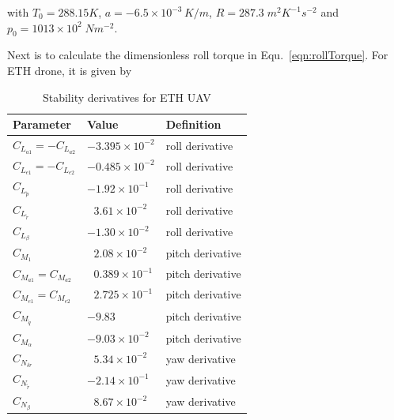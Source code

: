 with $T_0=288.15K$, $a = -6.5 \times 10^{-3} \, K/m$, $R=287.3\;m^2K^{-1}s^{-2}$ and $p_0=1013 \times 10^2 \;Nm^{-2}$.

Next is to calculate the dimensionless roll torque in Equ.~\ref{eqn:rollTorque}.
For ETH drone, it is given by \cite{stevens2015aircraft,ducard2009fault,mockli2006guidance}

\begin{table}
\label{arm:momentsETHcraft}
\caption{Stability derivatives for ETH UAV \cite{ducard2009fault}}
\label{arm:ethcraftStabilityDeriv}
\begin{center}
\begin{tabular}{ ||p{3cm}|p{3cm}|p{3cm}||}\hline
\textbf{Parameter} & \textbf{Value} & \textbf{Definition} \\\hline
$C_{L_{a1}} = - C_{L_{a2}}$ & $-3.395 \times 10^{-2}$	   & roll derivative \\\hline
$C_{L_{e1}} = - C_{L_{e2}}$ & $-0.485 \times 10^{-2}$         & roll derivative \\\hline
$C_{L_{\tilde{p}}}$                 & $-1.92 \times 10^{-1}$	   & roll derivative \\\hline
$C_{L_{\tilde{r}}} $                 & $\ \ \, 3.61 \times 10^{-2}$     & roll derivative \\\hline
$C_{L_\beta}$                        & $-1.30 \times 10^{-2}$	   & roll derivative \\\hline
$ C_{M_{1}}$                          & $\ \ \, 2.08 \times 10^{-2}$	   & pitch derivative \\\hline
$C_{M_{a1}} = C_{M_{a2}} $ & $\ \ \, 0.389 \times 10^{-1}$  & pitch derivative \\\hline
$C_{M_{e1}} = C_{M_{e2}} $ & $\ \ \, 2.725 \times 10^{-1}$  &  pitch derivative \\\hline
$C_{M_{\tilde{q}}} $               & $-9.83$	                            & pitch derivative \\\hline
$C_{M_\alpha} $                    & $-9.03 \times 10^{-2}$ 	   & pitch derivative \\\hline
$C_{N_{\delta r}}$                  & $\ \ \, 5.34 \times 10^{-2}$ 	   & yaw derivative \\\hline
$ C_{N_{\tilde{r}}}$                 & $-2.14 \times 10^{-1}$	   & yaw derivative \\\hline
$C_{N_\beta} $                       & $\ \ \, 8.67 \times 10^{-2}$	     & yaw derivative \\\hline
\end{tabular}
\end{center}
\end{table}

